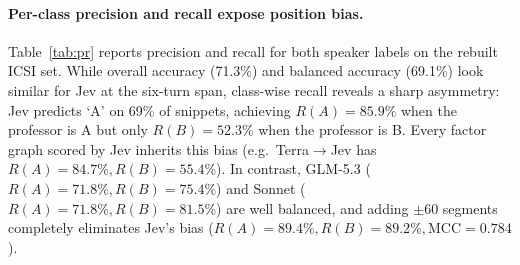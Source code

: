 \documentclass[11pt]{article}
\begin{document}
\paragraph{Per-class precision and recall expose position bias.}
Table~\ref{tab:pr} reports precision and recall for both speaker labels on the rebuilt ICSI set.
While overall accuracy (71.3\%) and balanced accuracy (69.1\%) look similar for Jev at the six-turn span, class-wise recall reveals a sharp asymmetry: Jev predicts `A' on 69\% of snippets, achieving $R(A)=85.9\%$ when the professor is A but only $R(B)=52.3\%$ when the professor is B.
Every factor graph scored by Jev inherits this bias (e.g.\ Terra$\to$Jev has $R(A)=84.7\%, R(B)=55.4\%$).
In contrast, GLM-5.3 ($R(A)=71.8\%, R(B)=75.4\%$) and Sonnet ($R(A)=71.8\%, R(B)=81.5\%$) are well balanced, and adding $\pm 60$ segments completely eliminates Jev's bias ($R(A)=89.4\%, R(B)=89.2\%, \textrm{MCC}=0.784$).

\begin{table}[t]
\centering\footnotesize
\setlength{\tabcolsep}{2.5pt}
\caption{Zero-shot evaluation across three models on the Nous API ($6{,}993$ snippet evaluations) under grammar/label perturbations and on the post-cutoff SCOTUS OT2026 benchmark. Heuristic baselines on SCOTUS-333: `Always A' 49.8\%, `More words' 48.3\%, `More \texttt{?} questions' 86.8\%.}
\label{tab:scotus}
\end{table}
\end{document}
